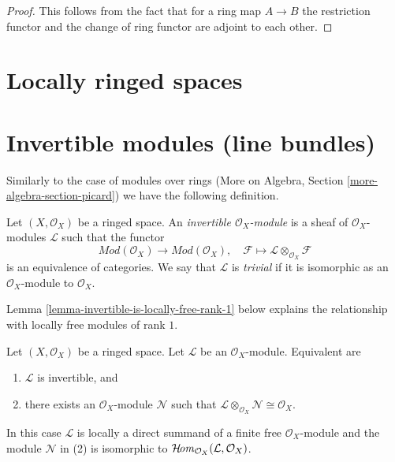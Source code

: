 \begin{proof}
This follows from the fact that for a ring map
$A \to B$ the restriction functor and the change
of ring functor are adjoint to each other.
\end{proof}

\section{Locally ringed spaces}
\label{section-locally-ringed-spaces}


\section{Invertible modules (line bundles)}
\label{section-invertible}

\noindent
Similarly to the case of modules over rings
(More on Algebra, Section \ref{more-algebra-section-picard})
we have the following definition.

\begin{definition}
\label{definition-invertible}
Let $(X, \mathcal{O}_X)$ be a ringed space. An
{\it invertible $\mathcal{O}_X$-module} is a sheaf
of $\mathcal{O}_X$-modules $\mathcal{L}$ such that
the functor
$$
\textit{Mod}(\mathcal{O}_X) \longrightarrow \textit{Mod}(\mathcal{O}_X),\quad
\mathcal{F} \longmapsto \mathcal{L} \otimes_{\mathcal{O}_X} \mathcal{F}
$$
is an equivalence of categories. We say that $\mathcal{L}$ is
{\it trivial} if it is isomorphic as an $\mathcal{O}_X$-module
to $\mathcal{O}_X$.
\end{definition}

\noindent
Lemma \ref{lemma-invertible-is-locally-free-rank-1}
below explains the relationship with locally free modules
of rank $1$.

\begin{lemma}
\label{lemma-invertible}
Let $(X, \mathcal{O}_X)$ be a ringed space. Let $\mathcal{L}$
be an $\mathcal{O}_X$-module. Equivalent are
\begin{enumerate}
\item $\mathcal{L}$ is invertible, and
\item there exists an $\mathcal{O}_X$-module $\mathcal{N}$
such that
$\mathcal{L} \otimes_{\mathcal{O}_X} \mathcal{N} \cong \mathcal{O}_X$.
\end{enumerate}
In this case $\mathcal{L}$ is locally a direct summand of a finite free
$\mathcal{O}_X$-module and the module $\mathcal{N}$ in (2) is isomorphic to
$\mathop{\mathcal{H}\!\mathit{om}}\nolimits_{\mathcal{O}_X}(\mathcal{L}, \mathcal{O}_X)$.
\end{lemma}

